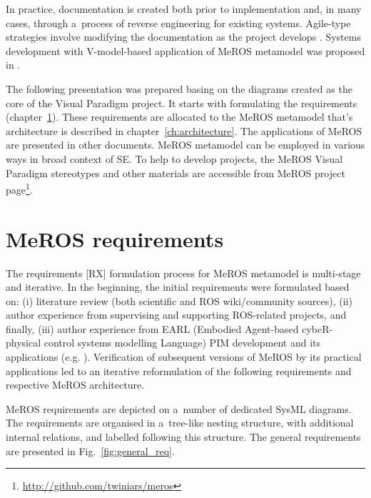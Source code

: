 \documentclass[11pt,oneside,a4paper]{report}
\begin{document}
	In practice, documentation is created both prior to implementation and, in many cases, through a~process of reverse  engineering \cite{canfora2007new} for existing systems. Agile-type strategies involve modifying the documentation as the project develops \cite{habib2021systematic}. Systems development with V-model-based application of MeROS metamodel was proposed in \cite{winiarski2025-v-model}.
			
	The following presentation was prepared basing on the diagrams created as the core of the Visual Paradigm project. It starts with formulating the requirements (chapter~\ref{ch:requirements}). These requirements are allocated to the MeROS metamodel that's architecture is described in chapter~\ref{ch:architecture}. The applications of MeROS are presented in other documents.
	MeROS metamodel can be employed in various ways in broad context of SE. To help to develop projects, the MeROS Visual Paradigm stereotypes and other materials are accessible from MeROS project page\footnote{\url{http://github.com/twiniars/meros}}. 
	
	
\chapter{MeROS requirements}
\label{ch:requirements}
	The requirements [RX] formulation process for MeROS metamodel is multi-stage and iterative. In the beginning, the initial requirements were formulated based on: (i) literature review (both scientific and ROS wiki/community sources), (ii) author experience from supervising and supporting ROS-related projects, and finally, (iii) author experience from EARL (Embodied Agent-based cybeR-physical control systems modelling Language) \cite{earl2020} PIM development and its applications (e.g. \cite{tasker2020,karwowski2021hubero,en14206693-grav-comp}). Verification of subsequent versions of MeROS by its practical applications led to an iterative reformulation of the following requirements and respective MeROS architecture.
	
	MeROS requirements are depicted on a~number of dedicated SysML diagrams. The requirements are organised in a~tree-like nesting structure, with additional internal relations, and labelled following this structure. The general requirements are presented in Fig.~\ref{fig:general_req}. 
		
\end{document}
